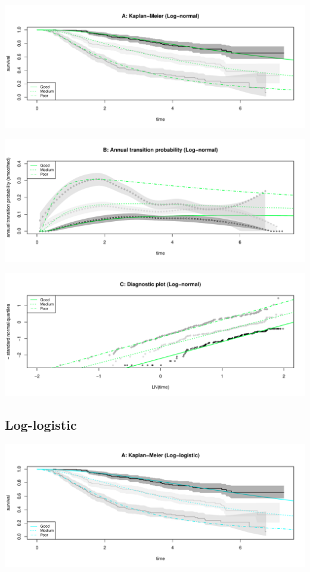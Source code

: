 \documentclass[]{article}
\begin{document}
\begin{flushleft}\includegraphics[height=0.3\textheight]{images/lnorm-1} \end{flushleft}

\begin{flushleft}\includegraphics[height=0.3\textheight]{images/lnorm-2} \end{flushleft}

\begin{flushleft}\includegraphics[height=0.3\textheight]{images/lnorm-3} \end{flushleft}

\subsection{Log-logistic}\label{log-logistic}

\begin{flushleft}\includegraphics[height=0.3\textheight]{images/llog-1} \end{flushleft}
\end{document}
